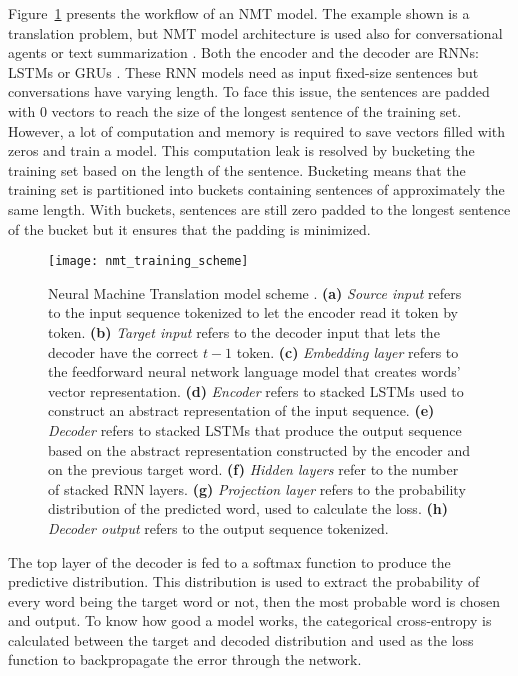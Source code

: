 Figure~\ref{fig:nmt} presents the workflow of an NMT model. The example shown is a translation problem, but NMT model architecture is used also for conversational agents or text summarization \citep{tensorflow.nmt}.
Both the encoder and the decoder are RNNs: LSTMs \citep{1409.3215,1508.04025} or GRUs \citep{1706.05125,1503.02364}. These RNN models need as input fixed-size sentences but conversations have varying length. To face this issue, the sentences are padded with $0$ vectors to reach the size of the longest sentence of the training set. However, a lot of computation and memory is required to save vectors filled with zeros and train a model. This computation leak is resolved by bucketing the training set based on the length of the sentence.
Bucketing means that the training set is partitioned into buckets containing sentences of approximately the same length. With buckets, sentences are still zero padded to the longest sentence of the bucket but it ensures that the padding is minimized.

\begin{figure}
    \centering
    \texttt{[image: nmt\_training\_scheme]}
    \decoRule
    \caption[Neural Machine Translation model scheme]{Neural Machine Translation model scheme \citep{tensorflow.nmt}. \textbf{(a)} \textit{Source input} refers to the input sequence tokenized to let the encoder read it token by token. \textbf{(b)} \textit{Target input} refers to the decoder input that lets the decoder have the correct $t-1$ token. \textbf{(c)} \textit{Embedding layer} refers to the feedforward neural network language model that creates words' vector representation. \textbf{(d)} \textit{Encoder} refers to stacked LSTMs used to construct an abstract representation of the input sequence. \textbf{(e)} \textit{Decoder} refers to stacked LSTMs that produce the output sequence based on the abstract representation constructed by the encoder and on the previous target word. \textbf{(f)} \textit{Hidden layers} refer to the number of stacked RNN layers. \textbf{(g)} \textit{Projection layer} refers to the probability distribution of the predicted word, used to calculate the loss. \textbf{(h)} \textit{Decoder output} refers to the output sequence tokenized.}
    \label{fig:nmt}
\end{figure}

The top layer of the decoder is fed to a softmax function to produce the predictive distribution. This distribution is used to extract the probability of every word being the target word or not, then the most probable word is chosen and output. To know how good a model works, the categorical cross-entropy is calculated between the target and decoded distribution and used as the loss function to backpropagate the error through the network.

